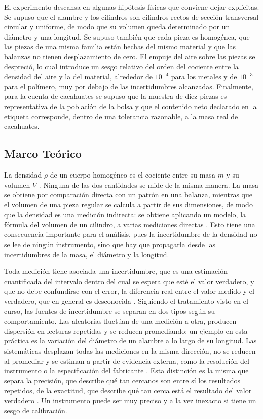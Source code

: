 El experimento descansa en algunas hipótesis físicas que conviene dejar explícitas. Se supuso que el alambre y los cilindros son cilindros rectos de sección transversal circular y uniforme, de modo que su volumen queda determinado por un diámetro y una longitud. Se supuso también que cada pieza es homogénea, que las piezas de una misma familia están hechas del mismo material y que las balanzas no tienen desplazamiento de cero. El empuje del aire sobre las piezas se despreció, lo cual introduce un sesgo relativo del orden del cociente entre la densidad del aire y la del material, alrededor de $10^{-4}$ para los metales y de $10^{-3}$ para el polímero, muy por debajo de las incertidumbres alcanzadas. Finalmente, para la cuenta de cacahuates se supuso que la muestra de diez piezas es representativa de la población de la bolsa y que el contenido neto declarado en la etiqueta corresponde, dentro de una tolerancia razonable, a la masa real de cacahuates.

\subsection{Marco Teórico}

La densidad $\rho$ de un cuerpo homogéneo es el cociente entre su masa $m$ y su volumen $V$ \cite{sears}. Ninguna de las dos cantidades se mide de la misma manera. La masa se obtiene por comparación directa con un patrón en una balanza, mientras que el volumen de una pieza regular se calcula a partir de sus dimensiones, de modo que la densidad es una medición indirecta: se obtiene aplicando un modelo, la fórmula del volumen de un cilindro, a varias mediciones directas \cite{diapositivas}. Esto tiene una consecuencia importante para el análisis, pues la incertidumbre de la densidad no se lee de ningún instrumento, sino que hay que propagarla desde las incertidumbres de la masa, el diámetro y la longitud.

Toda medición tiene asociada una incertidumbre, que es una estimación cuantificada del intervalo dentro del cual se espera que esté el valor verdadero, y que no debe confundirse con el error, la diferencia real entre el valor medido y el verdadero, que en general es desconocida \cite{taylor, coleman}. Siguiendo el tratamiento visto en el curso, las fuentes de incertidumbre se separan en dos tipos según su comportamiento. Las aleatorias fluctúan de una medición a otra, producen dispersión en lecturas repetidas y se reducen promediando; un ejemplo en esta práctica es la variación del diámetro de un alambre a lo largo de su longitud. Las sistemáticas desplazan todas las mediciones en la misma dirección, no se reducen al promediar y se estiman a partir de evidencia externa, como la resolución del instrumento o la especificación del fabricante \cite{coleman}. Esta distinción es la misma que separa la precisión, que describe qué tan cercanos son entre sí los resultados repetidos, de la exactitud, que describe qué tan cerca está el resultado del valor verdadero \cite{diapositivas}. Un instrumento puede ser muy preciso y a la vez inexacto si tiene un sesgo de calibración.

